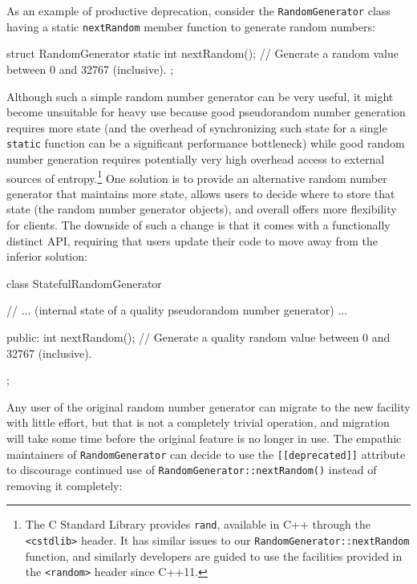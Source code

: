 As an example of productive deprecation, consider the
\lstinline!RandomGenerator! class having a static \lstinline!nextRandom!
member function to generate random numbers:

\begin{emcppslisting}[language=C++]
struct RandomGenerator
{
    static int nextRandom();
        // Generate a random value between 0 and 32767 (inclusive).
};
\end{emcppslisting}
    
\noindent Although such a simple random number generator can be very useful, it
might become unsuitable for heavy use because good pseudorandom number
generation requires more state (and the overhead of synchronizing such
state for a single \lstinline!static! function can be a significant
performance bottleneck) while good random number generation requires
potentially very high overhead access to external sources of
entropy.{\cprotect\footnote{The C Standard Library provides
\lstinline!rand!, available in C++ through the \lstinline!<cstdlib>! header.
It has similar issues to our \lstinline!RandomGenerator::nextRandom!
function, and similarly developers are guided to use the facilities
  provided in the \lstinline!<random>! header since C++11.}} One
solution is to provide an alternative random number generator that
maintains more state, allows users to decide where to store that state
(the random number generator objects), and overall offers more
flexibility for clients. The downside of such a change is that it comes
with a functionally distinct API, requiring that users update their code
to move away from the inferior solution:

\begin{emcppslisting}[language=C++]
class StatefulRandomGenerator
{
    // ... (internal state of a quality pseudorandom number generator) ...

public:
    int nextRandom();
       // Generate a quality random value between 0 and 32767 (inclusive).
};
\end{emcppslisting}
    
\noindent Any user of the original random number generator can migrate to the new
facility with little effort, but that is not a completely trivial
operation, and migration will take some time before the original feature is no
longer in use. The empathic maintainers of \lstinline!RandomGenerator! can
decide to use the
\lstinline![[deprecated]]! attribute to discourage continued use
of\linebreak%
 \lstinline!RandomGenerator::nextRandom()! instead of removing it completely:


